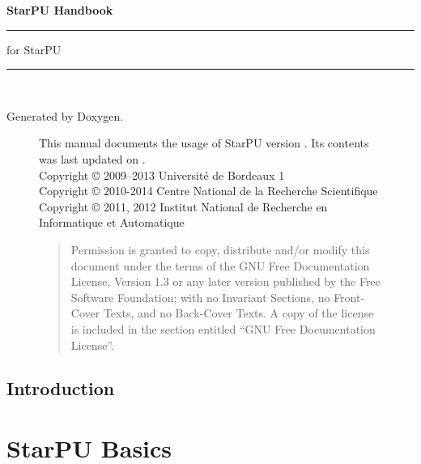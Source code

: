 
\begin{titlepage}
\vspace*{4cm}
{\Huge \textbf{StarPU Handbook}}\\
\rule{\textwidth}{1.5mm}
\begin{flushright}
{\Large for StarPU \STARPUVERSION}
\end{flushright}
\rule{\textwidth}{1mm}
~\\
\vspace*{15cm}
\begin{flushright}
Generated by Doxygen.
\end{flushright}
\end{titlepage}

\begin{figure}[p]
This manual documents the usage of StarPU version \STARPUVERSION. Its contents
was last updated on \STARPUUPDATED.\\

Copyright © 2009–2013 Université de Bordeaux 1\\

Copyright © 2010-2014 Centre National de la Recherche Scientifique\\

Copyright © 2011, 2012 Institut National de Recherche en Informatique et Automatique\\

\medskip

\begin{quote}
Permission is granted to copy, distribute and/or modify this document
under the terms of the GNU Free Documentation License, Version 1.3 or
any later version published by the Free Software Foundation; with no
Invariant Sections, no Front-Cover Texts, and no Back-Cover Texts. A
copy of the license is included in the section entitled “GNU Free
Documentation License”.
\end{quote}
\end{figure}

\tableofcontents
{}
\hypersetup{pageanchor=true,citecolor=blue}

\chapter{Introduction}
\label{index}
\hypertarget{index}{}


\part{StarPU Basics}


